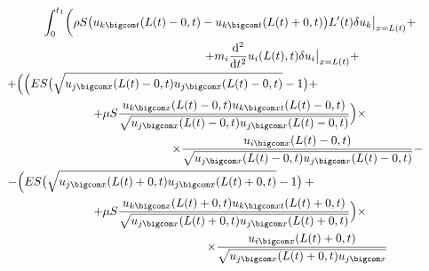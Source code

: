 \begin{multline}

\label{Anisimov_eq32}

\int_0^{t_1}

\biggl(\rho S\bigl(u_{k \bigcom t}(L(t)-0, t)-

u_{k \bigcom t}(L(t)+0, t)\bigr)L'(t)  \delta u_k\big|_{x=L(t)}+ \\%

\hspace{3.1cm}

+m_i\frac{\mathrm{d}^2}{\mathrm{d}t^2} u_i( L(t), t ) \delta u_i\big|_{x=L(t)}+

\\

+

\Bigl(\Bigl(ES\bigl(\sqrt{u_{j \bigcom x}(L(t)-0, t)u_{j \bigcom x}(L(t)-0, t)}-1\bigr)+ \hspace{4cm} \\%

+\mu S\frac{u_{k \bigcom x}(L(t)-0, t)u_{k \bigcom xt}(L(t)-0, t)} {\sqrt{u_{j \bigcom x}(L(t)-0, t)u_{j \bigcom x}(L(t)-0, t)}}\Bigr)

\times

\\

\hspace{4cm}

\times

\frac{u_{i \bigcom x}(L(t)-0, t)} {\sqrt{u_{j \bigcom x}(L(t)-0, t)u_{j \bigcom x}(L(t)-0, t)}}-\\%

-\Bigl(ES\bigl(\sqrt{u_{j \bigcom x}(L(t)+0, t)u_{j \bigcom x}(L(t)+0, t)}-1\bigr)+

{} 

\hspace{4cm} 

\\%

+\mu S

\frac{u_{k \bigcom x} (L(t)+ 0, t) u_{k \bigcom xt} (L(t)+ 0, t)} {\sqrt{u_{j \bigcom x}

(L(t)+0, t)u_{j \bigcom x} (L(t)+ 0, t)}}

\Bigr)

\times 

\\

\hspace{4cm}

\times

\frac{u_{i \bigcom x}(L(t)+0, t)} {\sqrt{u_{j \bigcom x} (L(t)+0, t) u_{j \bigcom x}

}}
\end{multline}

